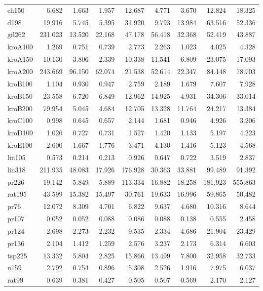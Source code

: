 \begin{center}
\begin{longtable}{lrrrrrrrr}
ch150  & 6.682 & 1.663 & 1.957 & 12.687 & 4.771 & 3.670 & 12.824 & 18.325\\
d198  & 19.916 & 5.745 & 5.395 & 31.920 & 9.793 & 13.984 & 63.516 & 52.336\\
gil262   & 231.023 & 13.520 & 22.168 & 47.178 & 56.418 & 32.368 & 52.419 & 43.887\\
kroA100   & 1.269 & 0.751 & 0.739 & 2.773 & 2.263 & 1.023 & 4.025 & 4.328\\
kroA150  & 10.130 & 3.806 & 2.339 & 10.338 & 11.541 & 6.809 & 23.075 & 17.093\\
kroA200  & 243.669 & 96.150 & 62.074 & 21.538 & 52.614 & 22.347 & 84.148 & 78.703\\
kroB100   & 1.104 & 0.930 & 0.947 & 2.759 & 2.189 & 1.679 & 7.607 & 7.928\\
kroB150   & 23.558 & 6.720 & 6.849 & 12.962 & 14.925 & 4.931 & 34.306 & 33.014\\
kroB200  & 79.954 & 5.045 & 4.684 & 12.705 & 13.328 & 11.764 & 24.217 & 13.384\\
kroC100  & 0.998 & 0.645 & 0.657 & 2.144 & 1.681 & 0.946 & 4.926 & 3.206\\
kroD100  & 1.026 & 0.727 & 0.731 & 1.527 & 1.420 & 1.133 & 5.197 & 4.223\\
kroE100  & 2.600 & 1.667 & 1.776 & 3.471 & 4.130 & 1.416 & 5.123 & 4.568\\
lin105  & 0.573 & 0.214 & 0.213 & 0.926 & 0.647 & 0.722 & 3.519 & 2.837\\
lin318   & 211.935 & 48.083 & 17.926 & 176.928 & 30.363 & 33.881 & 99.489 & 91.392\\
pr226   & 19.142 & 5.849 & 5.889 & 113.334 & 16.882 & 18.258 & 181.923 & 555.863\\
rat195 & 43.599 & 15.382 & 15.497 & 30.761 & 19.633 & 16.996 & 59.865 & 50.482\\
pr76  & 12.072 & 8.309 & 4.701 & 6.822 & 9.637 & 4.680 & 10.316 & 8.644\\
pr107 & 0.052 & 0.052 & 0.088 & 0.086 & 0.088 & 0.138 & 0.555 & 2.458\\
pr124  & 2.698 & 2.273 & 2.232 & 9.535 & 2.334 & 4.686 & 21.904 & 23.429\\
pr136  & 2.104 & 1.412 & 1.259 & 2.576 & 3.237 & 2.173 & 6.314 & 6.603\\
tsp225  & 13.332 & 5.804 & 2.825 & 15.866 & 13.499 & 7.800 & 32.958 & 32.733\\
u159  & 2.792 & 0.754 & 0.896 & 5.308 & 2.526 & 1.916 & 7.975 & 6.037\\
rat99   & 0.639 & 0.381 & 0.427 & 0.505 & 0.507 & 0.569 & 2.170 & 2.127\\

\end{longtable}
\end{center}

